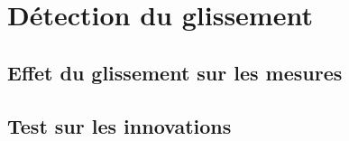
\section{Détection du glissement}

\subsection{Effet du glissement sur les mesures}

\subsection{Test sur les innovations}
